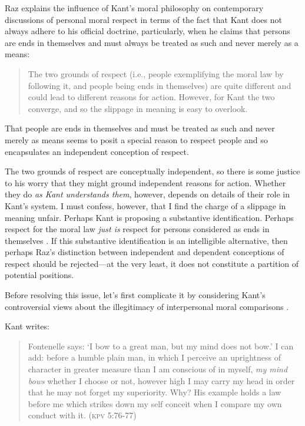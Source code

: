 \documentclass[12pt]{article}
\begin{document}
Raz explains the influence of Kant's moral philosophy on contemporary discussions of personal moral respect in terms of the fact that Kant does not always adhere to his official doctrine, particularly, when he claims that persons are ends in themselves and must always be treated as such and never merely as a means: 
\begin{quote}
	The two grounds of respect (i.e., people exemplifying the moral law by following it, and people being ends in themselves) are quite different and could lead to different reasons for action. However, for Kant the two converge, and so the slippage in meaning is easy to overlook. \citep[136]{Raz:2001ps} 
\end{quote}
That people are ends in themselves and must be treated as such and never merely as means seems to posit a special reason to respect people and so encapsulates an independent conception of respect.

The two grounds of respect are conceptually independent, so there is some justice to his worry that they might ground independent reasons for action. Whether they do \emph{as Kant understands them}, however, depends on details of their role in Kant's system. I must confess, however, that I find the charge of a slippage in meaning unfair. Perhaps Kant is proposing a substantive identification. Perhaps respect for the moral law \emph{just is} respect for persons considered as ends in themselves \citep[see][for a similar suggestion]{Velleman:2006nx}. If this substantive identification is an intelligible alternative, then perhaps Raz's distinction between independent and dependent conceptions of respect should be rejected---at the very least, it does not constitute a partition of potential positions.

Before resolving this issue, let's first complicate it by considering Kant's controversial views about the illegitimacy of interpersonal moral comparisons \citep[see][ch.~4, \S6]{Wood:1999zy}.

Kant writes: 
\begin{quote}
	Fontenelle says: `I bow to a great man, but my mind does not bow.' I can add: before a humble plain man, in which I perceive an uprightness of character in greater measure than I am conscious of in myself, \emph{my mind bows} whether I choose or not, however high I may carry my head in order that he may not forget my superiority. Why? His example holds a law before me which strikes down my self conceit when I compare my own conduct with it. (\textsc{kpv} 5:76-77) 
\end{quote}
\end{document}
